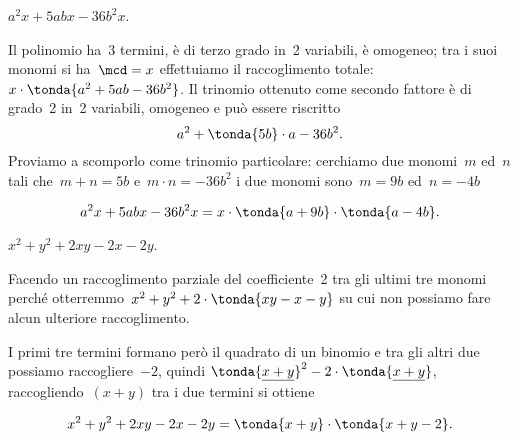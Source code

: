 % 
% 
% 
% 
% 
% 

 \begin{esempio}
 \(a^{2}x+5abx-36b^{2}x\).

Il polinomio ha~3 termini, è di terzo grado in~2 variabili, è omogeneo;
tra i suoi monomi si ha~\(\mcd= x\) effettuiamo il raccoglimento
totale:~\(x\cdot\tonda{a^{2}+5ab-36b^{2}}\).
Il trinomio ottenuto come secondo fattore è di grado~2 in~2 variabili,
omogeneo e può essere riscritto
\[a^{2}+\tonda{5b}\cdot a-36b^{2}.\]
Proviamo a scomporlo come trinomio particolare:
cerchiamo due monomi~\(m\) ed~\(n\) tali che~\(m+n=5b\)
e~\(m\cdot n=-36b^{2}\) i due monomi sono~\(m=9b\)
ed~\(n=-4b\)

\[a^{2}x+5abx-36b^{2}x=x\cdot\tonda{a+9b}\cdot \tonda{a-4b}.\]
 \end{esempio}

 \begin{esempio}
 \(x^{2}+y^{2}+2xy-2x-2y\).

Facendo un raccoglimento parziale del coefficiente~2 tra gli ultimi tre monomi 
perché otterremmo~\(x^{2}+y^{2}+2\cdot\tonda{xy-x-y}\) su cui non possiamo
fare alcun ulteriore raccoglimento.

I primi tre termini formano però il quadrato di un binomio e tra gli
altri due possiamo raccogliere~\(-2\), quindi
\(\tonda{\underline{{x+y}}}^{2}-2\cdot\tonda{\underline{{x+y}}}\),
raccogliendo~\((x + y)\) tra i due termini si ottiene

\begin{equation*}
x^{2}+y^{2}+2xy-2x-2y=\tonda{x+y}\cdot \tonda{x+y-2}.
\end{equation*}
 \end{esempio}

